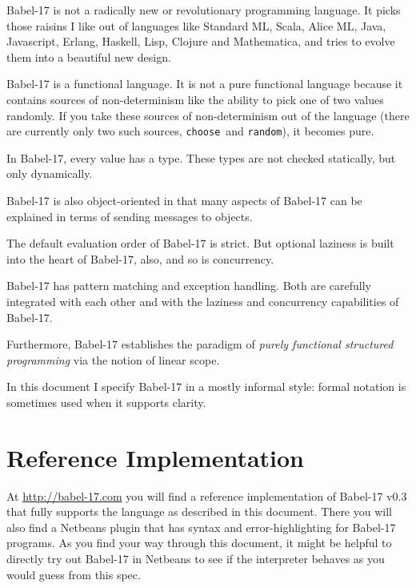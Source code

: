\documentclass[11pt]{amsart}
\newcommand{\babelsrc}[1] {\lstinline!#1!}
\begin{document}
Babel-17 is not a radically new or revolutionary programming language. It picks those raisins I like out of languages like Standard ML, Scala, Alice ML, Java, Javascript, Erlang, Haskell, Lisp, Clojure and Mathematica, and tries to evolve them into a beautiful new design. 

Babel-17 is a functional language. It is not a pure functional language because it contains sources of non-determinism like the ability to pick one of two values randomly. If you take these sources of non-determinism out of the language (there are currently only two such sources, \babelsrc{choose}\ and \babelsrc{random}), it becomes pure. 

In Babel-17, every value has a type. These types are not checked statically, but only dynamically. 

Babel-17 is also object-oriented in that many aspects of Babel-17 can be explained in terms of sending messages to objects. 

The default evaluation order of Babel-17 is strict. But optional laziness is built into the heart of Babel-17, also, and so is concurrency. 

Babel-17 has pattern matching and exception handling. Both are carefully integrated with each other and with the laziness and concurrency capabilities of Babel-17.

Furthermore, Babel-17 establishes the paradigm of \emph{purely functional structured programming}  via the notion of linear scope.

In this document  I specify Babel-17 in a mostly informal style: formal notation is sometimes used when it supports clarity.

\section{Reference Implementation}

At \url{http://babel-17.com} you will find a reference implementation of Babel-17 v0.3 that fully supports the language as described in this document. There you will also find a Netbeans plugin that has syntax and error-highlighting for Babel-17 programs. As you find your way through this document, it might be helpful to directly try out Babel-17 in Netbeans to see if the interpreter behaves as you would guess from this spec. 
\end{document}

